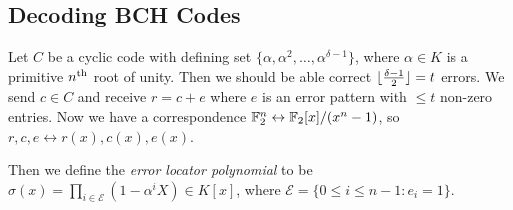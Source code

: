 \documentclass[10pt,a4paper]{article}
\begin{document}
\subsection{Decoding BCH Codes}
Let $C$ be a cyclic code with defining set $\{\alpha, \alpha^2, \ldots, \alpha^{\delta-1}\}$, where $\alpha \in K$ is a primitive $n\textsuperscript{th}$ root of unity. Then we should be able correct $\lfloor \frac{\delta-1}{2} \rfloor = t$ errors. We send $c\in C$ and receive $r = c+e$ where $e$ is an error pattern with $\leq t$ non-zero entries. Now we have a correspondence $\mathbb{F}_2^n \leftrightarrow \mathbb{F}_2[x]/(x^n-1)$, so $r, c, e \leftrightarrow r(x), c(x), e(x)$. 

Then we define the \emph{error locator polynomial} to be $\sigma(x) = \prod_{i \in \mathcal{E}} (1-\alpha^i X) \in K[x]$, where $\mathcal{E} = \{0 \leq i\leq n-1:e_i = 1\}$.
\end{document}
